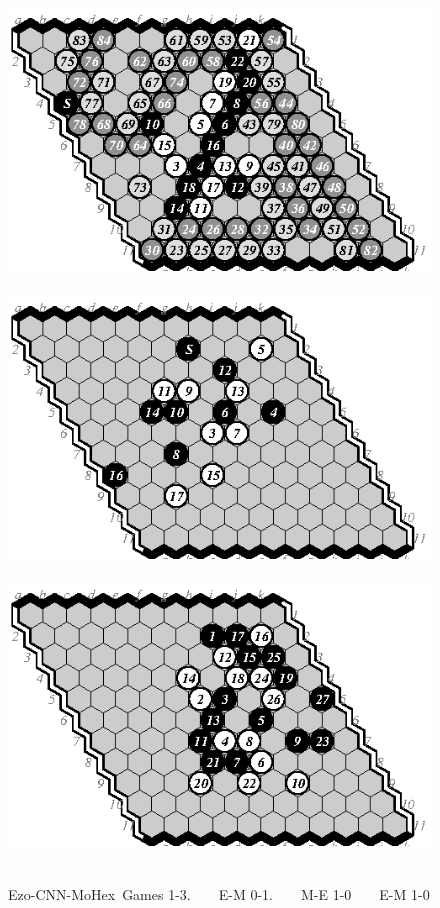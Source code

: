 \documentclass{icga}
\def\Ec{\mbox{\sc Ezo-CNN}}
\def\Mx{\mbox{\sc MoHex}}
\begin{document}
\begin{figure}[hbp]
\includegraphics[scale=1]{pix/11.em1plus.eps}\hspace*{-1.2cm}\
\includegraphics[scale=1]{pix/11.me2.eps}\hspace*{-1.2cm}\
\includegraphics[scale=1]{pix/11.em3.eps}\hspace*{-1.2cm}\
\caption{\Ec-\Mx\ Games 1-3. ~ ~ E-M 0-1. ~ ~ M-E 1-0 ~ ~ E-M 1-0}
\label{fig:EM1-3}
\end{figure}
\end{document}

